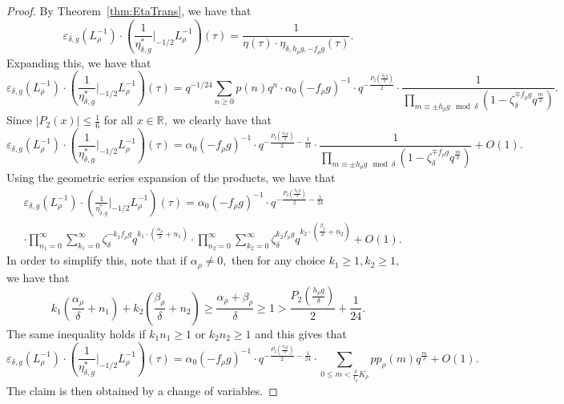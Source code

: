 \documentclass[10pt]{amsart}
\theoremstyle{definition}
\theoremstyle{remark}
\numberwithin{equation}{section}
\newcommand{\RR}{\mathbb R}
\begin{document}
	\begin{proof}
	By Theorem~\ref{thm:EtaTrans}, we have that
	$$
	\varepsilon_{\delta,g}(L_\rho^{-1})\cdot \left(\frac{1}{\eta_{\delta,g}^\ast}\Bigg|_{-1/2}{L_\rho^{-1}}\right)(\tau) = \frac{1}{\eta(\tau)\cdot \eta_{\delta,h_\rho g,-f_\rho g}(\tau)}.
	$$
	Expanding this, we have that
	$$
	\varepsilon_{\delta,g}(L_\rho^{-1})\cdot \left(\frac{1}{\eta_{\delta,g}^\ast}\Bigg|_{-1/2}{L_\rho^{-1}}\right)(\tau) = q^{-1/24}\sum\limits_{n\geq 0}p(n)q^n \cdot\alpha_0(-f_\rho g)^{-1}\cdot q^{-\frac{P_2\left(\frac{h_\rho g}{\delta}\right)}{2}}\cdot\frac{1}{\prod\limits_{m\equiv \pm h_\rho g\mod\delta}(1-\zeta_\delta^{\mp f_\rho g}q^{\frac{m}{\delta}})}.
	$$
	Since $|P_2(x)|\leq \frac{1}{6}$ for all $x\in\RR,$ we clearly have that
	$$
	\varepsilon_{\delta,g}(L_\rho^{-1})\cdot \left(\frac{1}{\eta_{\delta,g}^\ast}\Bigg|_{-1/2}{L_\rho^{-1}}\right)(\tau) = \alpha_0(-f_\rho g)^{-1}\cdot q^{-\frac{P_2\left(\frac{h_\rho g}{\delta}\right)}{2}-\frac{1}{24}}\cdot\frac{1}{\prod\limits_{m\equiv \pm h_\rho g\mod\delta}(1-\zeta_\delta^{\mp f_\rho g}q^{\frac{m}{\delta}})}+O(1).
	$$
	Using the geometric series expansion of the products, we have that
	\begin{align*}
	&	\varepsilon_{\delta,g}(L_\rho^{-1})\cdot \left(\frac{1}{\eta_{\delta,g}^\ast}\Bigg|_{-1/2}{L_\rho^{-1}}\right)(\tau) = \alpha_0(-f_\rho g)^{-1}\cdot q^{-\frac{P_2\left(\frac{h_\rho g}{\delta}\right)}{2}-\frac{1}{24}}\\ 
			&\cdot\prod\limits_{n_1=0}^\infty\sum\limits_{k_1=0}^\infty\zeta_{\delta}^{-k_1f_\rho g}q^{k_1\cdot\left(\frac{\alpha_\rho}{\delta}+n_1\right)}\cdot \prod\limits_{n_2=0}^\infty\sum\limits_{k_2=0}^\infty\zeta_{\delta}^{k_2f_\rho g}q^{k_2\cdot\left(\frac{\beta_\rho}{\delta}+n_2\right)} + O(1).
		\end{align*}
		In order to simplify this, note that if $\alpha_\rho\neq 0,$ then for any choice $k_1\geq 1, k_2\geq 1,$ we have that
		$$
		k_1\left(\frac{\alpha_\rho}{\delta}+n_1\right)+k_2\left(\frac{\beta_\rho}{\delta}+n_2\right)\geq \frac{\alpha_\rho+\beta_\rho}{\delta}\geq 1 > \frac{P_2\left(\frac{h_\rho g}{\delta}\right)}{2}+\frac{1}{24}.
		$$
		The same inequality holds if $k_1n_1\geq 1$ or $k_2n_2\geq 1$ and this gives that
		\begin{equation}\label{eq:EtaGenTransAppFourier}
		\varepsilon_{\delta,g}(L_\rho^{-1})\cdot \left(\frac{1}{\eta_{\delta,g}^\ast}\Bigg|_{-1/2}{L_\rho^{-1}}\right)(\tau) = \alpha_0(-f_\rho g)^{-1}\cdot q^{-\frac{P_2\left(\frac{h_\rho g}{\delta}\right)}{2}-\frac{1}{24}}\cdot\sum\limits_{0\leq m<\frac{\delta}{t_\rho}K_\rho} pp_\rho(m)q^{\frac{m}{\delta}} + O(1).
		\end{equation}
		The claim is then obtained by a change of variables.
	\end{proof}
	
\end{document}
